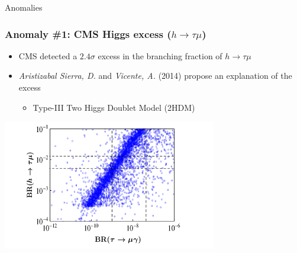 \documentclass[xcolor=table]{beamer}
\begin{document}
\begin{frame}

\begin{center}
{\Huge Anomalies}
\end{center}

\end{frame}


\begin{frame}
\frametitle{Anomaly \#1: CMS Higgs excess ($h\to \tau\mu$)}

\begin{itemize}
\item CMS detected a $2.4\sigma$ excess in the branching fraction of $h\to\tau\mu$
\item \emph{Aristizabal Sierra, D.} and \emph{Vicente, A.} (2014) propose an explanation of the excess
\begin{itemize}
\item Type-III Two Higgs Doublet Model (2HDM)
\end{itemize}
\end{itemize}

\begin{center}
\includegraphics[width=0.7\textwidth]{images/h-tau-mu.png}
\end{center}


\end{frame}




\end{document}
